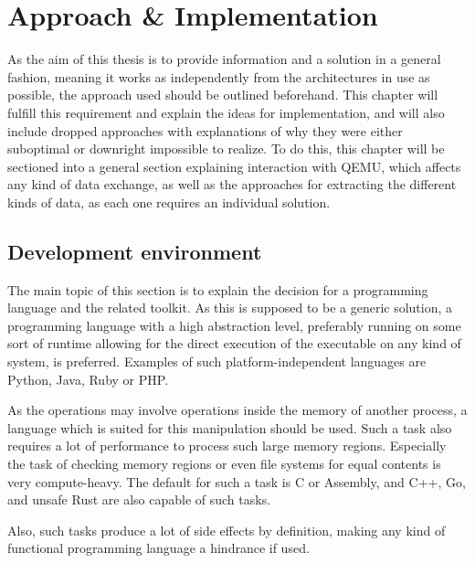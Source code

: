 \chapter{Approach \& Implementation}\label{chap:implementation}
As the aim of this thesis is to provide information and a solution in a general fashion,
meaning it works as independently from the architectures in use as possible,
the approach used should be outlined beforehand.
This chapter will fulfill this requirement
and explain the ideas for implementation,
and will also include dropped approaches with explanations of
why they were either suboptimal or downright impossible to realize.
To do this, this chapter will be sectioned into a general section explaining interaction with QEMU,
which affects any kind of data exchange,
as well as the approaches for extracting the different kinds of data,
as each one requires an individual solution.

\section{Development environment}
The main topic of this section is to explain the decision for a programming language and the related toolkit.
As this is supposed to be a generic solution, a programming language with a high abstraction level,
preferably running on some sort of runtime allowing for the direct execution of the executable on any kind of system, is preferred.
Examples of such platform-independent languages are Python, Java, Ruby or PHP.

As the operations may involve operations inside the memory of another process,
a language which is suited for this manipulation should be used.
Such a task also requires a lot of performance to process such large memory regions.
Especially the task of checking memory regions or even file systems for equal contents is very compute-heavy.
The default for such a task is C or Assembly, and C++, Go, and unsafe Rust are also capable of such tasks.

Also, such tasks produce a lot of side effects by definition,
making any kind of functional programming language a hindrance if used.

